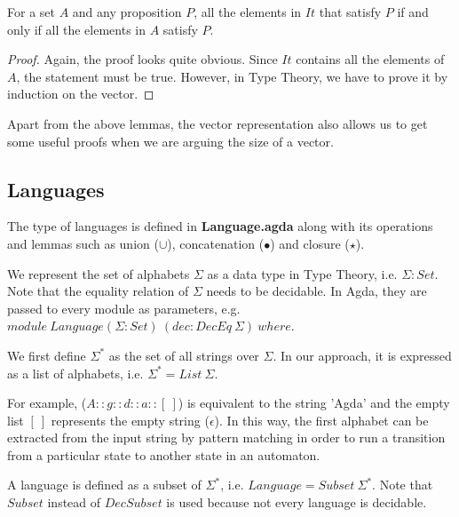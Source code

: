 \begin{lem}
\noindent For a set \(A\) and any proposition \(P\), all
the elements in \(It\) that satisfy \(P\) if and only if all the 
elements in \(A\) satisfy \(P\). 
\end{lem}

\begin{proof}
\noindent Again, the proof looks quite obvious. Since \(It\) contains all the
elements of \(A\), the statement must be true. However, in Type
Theory, we have to prove it by induction on the vector.
\end{proof}

\par Apart from the above lemmas, the vector representation also allows
us to get some useful proofs when we are arguing the size of a
vector. 


\subsection{Languages}
\par The type of languages is defined in \textbf{Language.agda} along with its 
operations and lemmas such as union (\(\cup\)), concatenation
(\(\bullet\)) and closure (\(\star\)). 

\par We represent the set of alphabets \(\Sigma\) as a data type in
Type Theory, i.e. \(\Sigma : Set\). Note that the equality relation of \(\Sigma\) needs to be
decidable. In Agda, they are passed to every module as
parameters, e.g. \(module\ Language (\Sigma : Set)\ (dec : DecEq\
\Sigma)\ where\). 

\begin{defn}
\noindent We first define \(\Sigma^*\) as the set of all
strings over \(\Sigma\). In our approach, it is expressed as a list of
alphabets, i.e. \(\Sigma^* = List\ \Sigma\). 
\end{defn}

\par For example, (\(A :: g :: d :: a :: [\ ]\)) is equivalent to the
string 'Agda' and the empty list \([\ ]\)
represents the empty string (\(\epsilon\)). In this way, the first
alphabet can be extracted from the input string by pattern matching in order to
run a transition from a particular state to another state in an automaton. 

\begin{defn}
\noindent A language is defined as a subset of 
\(\Sigma^*\), i.e. \(Language = Subset\ \Sigma^*\). 
Note that \(Subset\) instead of \(DecSubset\) is used because not
every language is decidable. 
\end{defn}

